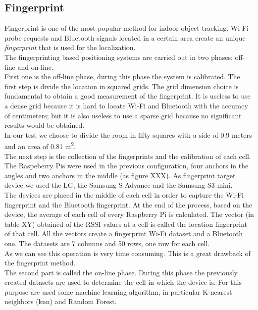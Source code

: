 \subsection{Fingerprint}
Fingerprint is one of the most popular method for indoor object tracking. Wi-Fi probe requests and Bluetooth signals located in a certain area create an unique \textit{fingerprint}  that is used for the localization.\\
The fingerprinting based positioning systems are carried out in two phases: off-line and on-line.\\
\linebreak
First one is the off-line phase, during this phase the system is calibrated. The first step is divide the location in squared grids. The grid dimension choice is fundamental to obtain a good measurement of the fingerprint. It is useless to use a dense grid because it is hard to locate Wi-Fi and Bluetooth with the accuracy of centimeters; but it is also useless to use a sparse grid because no significant results would be obtained. \\
In our test we choose to divide the room in fifty squares with a side of 0.9 meters and an area of 0.81 m\textsuperscript{2}.\\
\linebreak
The next step is the collection of the fingerprints and the calibration of each cell. The Raspeberry Pis were used in the previous configuration, four anchors in the angles and two anchors in the middle (as figure XXX). As fingerprint target device we used the LG, the Samsung S Advance and the Samsung S3 mini.\\
The devices are placed in the middle of each cell in order to capture the Wi-Fi fingerprint and the Bluetooth fingerprint. At the end of the process, based on the device, the average of each cell of every Raspberry Pi is calculated. The vector (in table XY) obtained of the RSSI values at a cell is called the location fingerprint of that cell. All the vectors create a fingerprint Wi-Fi dataset and a Bluetooth one.  The datasets are 7 columns and 50 rows, one row for each cell.\\
As we can see this operation is very time consuming. This is a great drawback of the fingerprint method.\\
\linebreak
The second part is called the on-line phase. During this phase the previously created datasets are used to determine the cell in which the device is. For this purpose are used some machine learning algorithm, in particular K-nearest neighbors (knn) and Random Forest.

